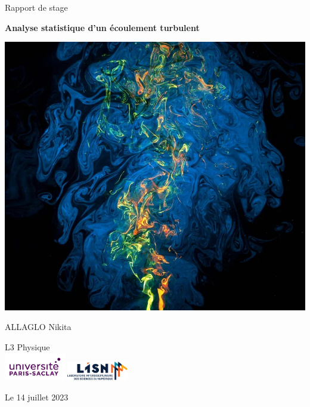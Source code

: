 \documentclass[13pt, a4paper]{extarticle}
\begin{document}
    
\begin{titlepage}
    \begin{center}
  
        {\Huge Rapport de stage}
        
        \vspace{0.2cm}
   
              \centering
        {\huge \bf Analyse statistique d'un écoulement turbulent}
        
        \vspace{2cm}
        \centering
        \includegraphics[width=14cm]{figs/turb.jpg}

             \vspace{1.5cm}
              {\huge ALLAGLO Nikita} \\
             
              \vspace{3cm}
 
        {\huge L3 Physique}\\
          \centering
          \includegraphics[width=0.2\textwidth]{figs/logo_PS.jpg} 
          \includegraphics[width=0.2\textwidth]{figs/logo_lisn.png}
              \vspace{1cm}
             
        {\large Le 14 juillet 2023}
  
    \end{center}
 \end{titlepage}
\end{document}
